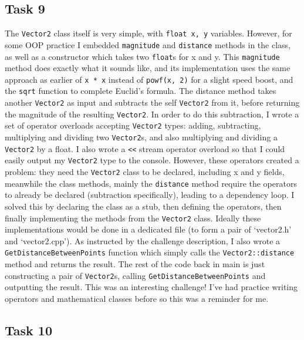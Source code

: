 \documentclass[
]{article}
\begin{document}
\subsection{Task 9}\label{task-9}

The \texttt{Vector2} class itself is very simple, with
\texttt{float\ x,\ y} variables. However, for some OOP practice I
embedded \texttt{magnitude} and \texttt{distance} methods in the class,
as well as a constructor which takes two \texttt{float}s for x and y.
This \texttt{magnitude} method does exactly what it sounds like, and its
implementation uses the same approach as earlier of \texttt{x\ *\ x}
instead of \texttt{powf(x,\ 2)} for a slight speed boost, and the
\texttt{sqrt} function to complete Euclid's formula. The distance method
takes another \texttt{Vector2} as input and subtracts the self
\texttt{Vector2} from it, before returning the magnitude of the
resulting \texttt{Vector2}. In order to do this subtraction, I wrote a
set of operator overloads accepting \texttt{Vector2} types: adding,
subtracting, multiplying and dividing two \texttt{Vector2}s, and also
multiplying and dividing a \texttt{Vector2} by a float. I also wrote a
\texttt{\textless{}\textless{}} stream operator overload so that I could
easily output my \texttt{Vector2} type to the console. However, these
operators created a problem: they need the \texttt{Vector2} class to be
declared, including x and y fields, meanwhile the class methods, mainly
the \texttt{distance} method require the operators to already be
declared (subtraction specifically), leading to a dependency loop. I
solved this by declaring the class as a stub, then defining the
operators, then finally implementing the methods from the
\texttt{Vector2} class. Ideally these implementations would be done in a
dedicated file (to form a pair of `vector2.h' and `vector2.cpp'). As
instructed by the challenge description, I also wrote a
\texttt{GetDistanceBetweenPoints} function which simply calls the
\texttt{Vector2::distance} method and returns the result. The rest of
the code back in main is just constructing a pair of \texttt{Vector2}s,
calling \texttt{GetDistanceBetweenPoints} and outputting the result.
This was an interesting challenge! I've had practice writing operators
and mathematical classes before so this was a reminder for me.

\subsection{Task 10}\label{task-10}
\end{document}
